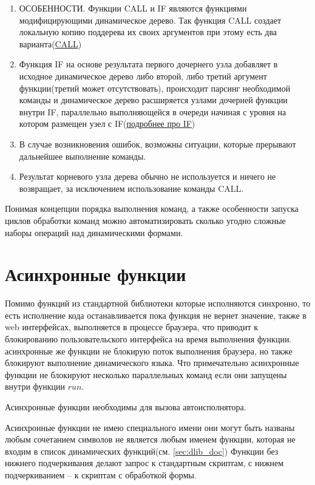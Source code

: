 \documentclass[../index.tex]{subfiles}
\begin{document}
\begin{enumerate}
    \item ОСОБЕННОСТИ. Функции CALL и IF являются функциями модифицирующими динамическое дерево. Так функция CALL создает локальную копию поддерева их своих аргументов при этому есть два варианта(\hyperref[sec:fcall]{CALL})
    \item Функция IF на основе результата первого дочернего узла добавляет в исходное динамическое дерево либо второй, либо третий аргумент функции(третий может отсутствовать), происходит парсинг необходимой команды и динамическое дерево расширяется узлами дочерней функции внутри IF, параллельно выполняющейся в очереди начиная с уровня на котором размещен узел с IF(\hyperref[sec:fif]{подробнее про IF})
    \item В случае возникновения ошибок, возможны ситуации, которые прерывают дальнейшее выполнение команды.
    \item Результат корневого узла дерева обычно не используется и ничего не возвращает, за исключением  использование команды CALL.
\end{enumerate}

Понимая концепции порядка выполнения команд, а также особенности запуска циклов обработки команд можно автоматизировать сколько угодно сложные наборы операций над динамическими формами.

\label{sec:async}
\section{Асинхронные функции}

Помимо функций из стандартной библиотеки которые исполняются синхронно, 
то есть исполнение кода останавливается пока функция не вернет значение, также 
в web интерфейсах, выполняется в процессе браузера, что приводит к блокированию 
пользовательского интерфейса на время выполнения функции.
асинхронные же функции не блокирую поток выполнения браузера, но также блокируют 
выполнение динамического языка. Что примечательно асинхронные функции не блокируют
несколько параллельных команд если они запущены внутри функции $run$.

Асинхронные функции необходимы для вызова автоисполнятора.

Асинхронные функции не имею специального имени они могут быть названы любым сочетанием символов
не является любым именем функции, которая не входим в список динамических функций(см. \autoref{sec:dlib_doc})
Функции без нижнего подчеркивания делают запрос к стандартным скриптам, с нижнем подчеркиванием -- 
к скриптам с обработкой формы.
\end{document}
